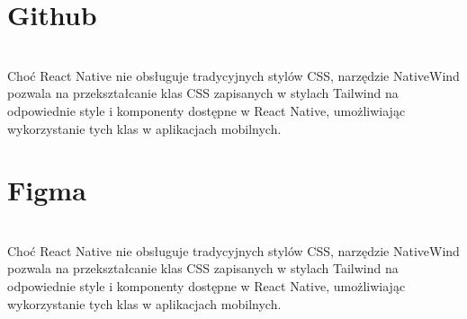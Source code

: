 \section{Github}\\
Choć React Native nie obsługuje tradycyjnych stylów CSS, narzędzie NativeWind pozwala na przekształcanie klas CSS zapisanych w stylach Tailwind na odpowiednie style i komponenty dostępne w React Native, umożliwiając wykorzystanie tych klas w aplikacjach mobilnych.\\


\section{Figma}\\
Choć React Native nie obsługuje tradycyjnych stylów CSS, narzędzie NativeWind pozwala na przekształcanie klas CSS zapisanych w stylach Tailwind na odpowiednie style i komponenty dostępne w React Native, umożliwiając wykorzystanie tych klas w aplikacjach mobilnych.\\

